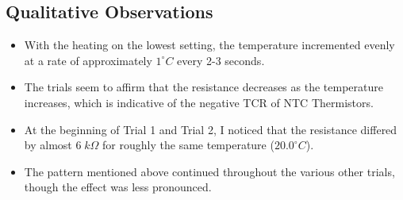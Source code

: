 \subsection{Qualitative Observations}
\begin{itemize}[noitemsep]
    \item With the heating on the lowest setting, the temperature incremented evenly at a rate of approximately $1^\circ C$ every 2-3 seconds.
    \item The trials seem to affirm that the resistance decreases as the temperature increases, which is indicative of the negative TCR of NTC Thermistors.
    \item At the beginning of Trial 1 and Trial 2, I noticed that the resistance differed by almost $6 \; k\Omega$ for roughly the same temperature ($20.0^\circ C$).
    \item The pattern mentioned above continued throughout the various other trials, though the effect was less pronounced.
\end{itemize}
